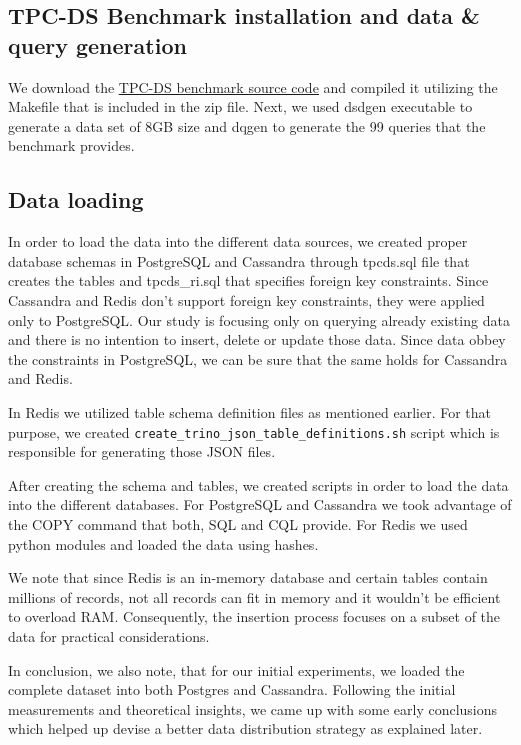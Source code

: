 \documentclass[conference]{IEEEtran}
\begin{document}
\subsection{TPC-DS Benchmark installation and data \& query generation}

We download the \textcolor{linkblue}{\underline{\href{https://www.tpc.org/tpc_documents_current_versions/current_specifications5.asp}{TPC-DS benchmark source code}}} and compiled it
utilizing the Makefile that is included in the zip file. Next, we used dsdgen executable to generate a data set of 8GB size and dqgen to generate the 99 queries that the benchmark provides.

\subsection{Data loading}

In order to load the data into the different data sources, we created proper database schemas in PostgreSQL and Cassandra through 
tpcds.sql file that creates the tables and tpcds\_ri.sql that specifies foreign key constraints. Since Cassandra and Redis don't support foreign key constraints, they were applied only to PostgreSQL. Our 
study is focusing only on querying already existing data and there is no intention to insert, delete or update those data. Since data obbey the constraints in PostgreSQL, we can be sure that the same holds
for Cassandra and Redis.

In Redis we utilized table schema definition files as mentioned earlier. For that purpose, we created \texttt{create\_trino\_json\_table\_definitions.sh} script which is responsible for generating those JSON files.

After creating the schema and tables, we created scripts in order to load the data into the different databases. For PostgreSQL and Cassandra we took advantage of the COPY command that both, SQL and CQL provide.
For Redis we used python modules and loaded the data using hashes.

We note that since Redis is an in-memory database and certain tables contain millions of records, not all records can fit in memory and it wouldn't be efficient to overload RAM. Consequently, the insertion process
focuses on a subset of the data for practical considerations.

In conclusion, we also note, that for our initial experiments, we loaded the complete dataset into both Postgres and Cassandra. Following the initial measurements and theoretical insights, we came up with some early conclusions 
which helped up devise a better data distribution strategy as explained later.
\end{document}
